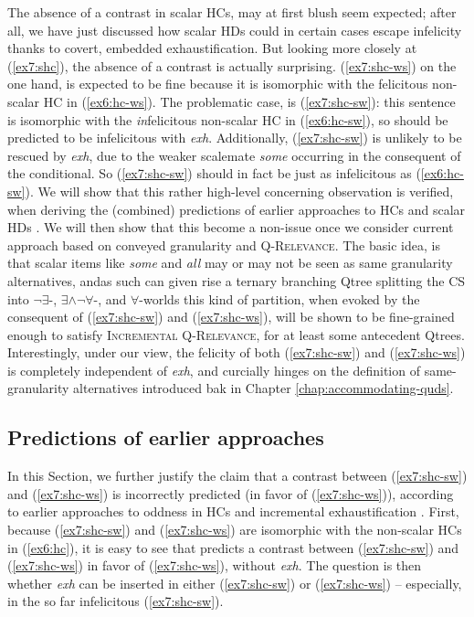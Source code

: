 The absence of a contrast in scalar HCs, may at first blush seem expected; after all, we have just discussed how scalar HDs could  in certain cases escape infelicity thanks to covert, embedded exhaustification. But looking more closely at (\ref{ex7:shc}), the absence of a contrast is actually surprising. (\ref{ex7:shc-ws}) on the one hand, is expected to be fine because it is isomorphic with the felicitous non-scalar HC in (\ref{ex6:hc-ws}). The problematic case, is (\ref{ex7:shc-sw}): this sentence is isomorphic with the \textit{in}felicitous non-scalar HC in (\ref{ex6:hc-sw}), so should be predicted to be infelicitous with \textit{exh}. Additionally, (\ref{ex7:shc-sw}) is unlikely to be rescued by \textit{exh}, due to the weaker scalemate \textit{some} occurring in the consequent of the conditional. So (\ref{ex7:shc-sw}) should in fact be just as infelicitous as (\ref{ex6:hc-sw}). We will show that this rather high-level concerning observation is verified, when deriving the (combined) predictions of earlier approaches to HCs \citep{Kalomoiros2024} and scalar HDs \citep{Fox2018}. We will then show that this become a non-issue once we consider current approach based on conveyed granularity and \textsc{Q-Relevance}. The basic idea, is that scalar items like \textit{some} and \textit{all} may or may not be seen as same granularity alternatives, andas such can given rise a ternary branching Qtree splitting the CS into $\neg\exists$-, $\exists\wedge\neg\forall$-, and $\forall$-worlds this kind of partition, when evoked by the consequent of (\ref{ex7:shc-sw}) and (\ref{ex7:shc-ws}), will be shown to be fine-grained enough to satisfy \textsc{Incremental Q-Relevance}, for at least some antecedent Qtrees. Interestingly, under our view, the felicity of both (\ref{ex7:shc-sw}) and (\ref{ex7:shc-ws}) is completely independent of \textit{exh}, and curcially hinges on the definition of same-granularity alternatives introduced bak in Chapter \ref{chap:accommodating-quds}.

\subsection{Predictions of earlier approaches}
In this Section, we further justify the claim that a contrast between (\ref{ex7:shc-sw}) and (\ref{ex7:shc-ws}) is incorrectly predicted (in favor of (\ref{ex7:shc-ws})), according to earlier approaches to oddness in HCs \citep{Kalomoiros2024} and incremental exhaustification \citep{Fox2018}. First, because (\ref{ex7:shc-sw}) and (\ref{ex7:shc-ws}) are isomorphic with the non-scalar HCs in (\ref{ex6:hc}), it is easy to see that \citet{Kalomoiros2024} predicts a contrast between (\ref{ex7:shc-sw}) and (\ref{ex7:shc-ws}) in favor of (\ref{ex7:shc-ws}), without \textit{exh}. The question is then whether \textit{exh} can be inserted in either (\ref{ex7:shc-sw}) or (\ref{ex7:shc-ws}) -- especially, in the so far infelicitous (\ref{ex7:shc-sw}).\\

